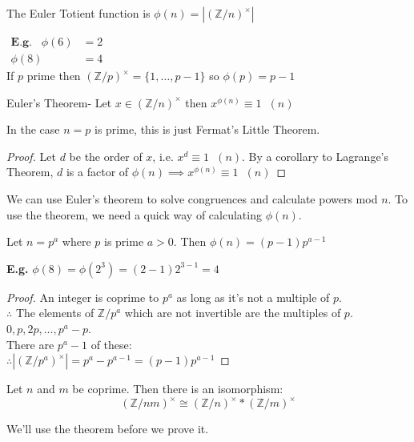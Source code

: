 \documentclass[11pt]{article}
\begin{document}
\begin{definition}
	The Euler Totient function is $\phi(n) = |(\mathbb{Z}/n)^\times | $
\end{definition}
\raggedright
\begin{align*}	
	\textbf{E.g.} \hspace{10pt}\phi(6) &= 2 &\hspace{200pt}\\
	  \phi(8) &= 4 &\hspace{400pt}
\end{align*}
If $p$ prime then $(\mathbb{Z}/p)^\times = \{1, \dots, p-1 \}$ so  $\phi(p) = p-1$

\begin{theorem}
	Euler's Theorem- Let $x \in (\mathbb{Z}/n)^\times$ then $x^{\phi(n)} \equiv 1\hspace{7pt} (n) $ 
\end{theorem}
In the case $n=p$ is prime, this is just Fermat's Little Theorem.



\begin{proof}
	Let $d$ be the order of $x$, i.e. $x^{d} \equiv 1 \hspace{7pt} (n) $.
	By a corollary to Lagrange's Theorem, $d$ is a factor of $\phi(n) \implies x^{\phi (n)} \equiv 1 \hspace{7pt} (n)$ 
\end{proof}
We can use Euler's theorem to solve congruences and calculate powers mod $n$. To use the theorem, we need a quick way of calculating $\phi(n) $.

\begin{lemma}
	Let $n=p^a$ where $p$ is prime $a>0$. Then $\phi(n) = (p-1)p^{a-1}$
\end{lemma}
\textbf{E.g.} $\phi(8) = \phi(2^3) = (2-1)2^{3-1} = 4$
\begin{proof}
An integer is coprime to $p^a$ as long as it's not a multiple of $p$.\\
	$\therefore $ The elements of $\mathbb{Z}/p^a$ which are not invertible are the multiples of $p$. $0, p, 2p, \dots, p^a - p$.\\
	There are $p^a-1$ of these:\vspace{10pt}\\
	$\therefore |(\mathbb{Z}/p^a)^\times| = p^a - p^{a-1} = (p-1)p^{a-1}$
\end{proof}


\begin{theorem}
	Let $n$ and $m$ be coprime. Then there is an isomorphism:
	\begin{equation*}
		(\mathbb{Z}/nm)^\times \cong (\mathbb{Z}/n)^\times * (\mathbb{Z}/m)^\times
	\end{equation*}
\end{theorem}
We'll use the theorem before we prove it.\\
\end{document}
